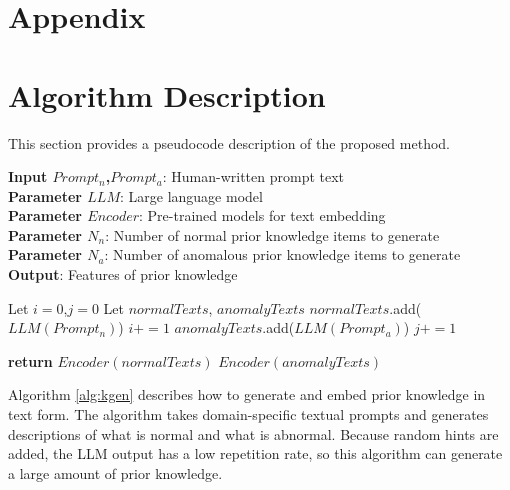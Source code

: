 \clearpage
\appendix
\section*{Appendix}
\renewcommand{\thefigure}{A\arabic{figure}}
\renewcommand{\thetable}{A\arabic{table}}
\renewcommand{\thealgorithm}{A\arabic{algorithm}}
\setcounter{figure}{0}
\setcounter{table}{0}
\setcounter{algorithm}{0}

\section{Algorithm Description}

This section provides a pseudocode description of the proposed method.

\begin{algorithm}[htb]
\caption{Algorithm for prior knowledge generation}
\label{alg:kgen}
\textbf{Input $Prompt_{n}$,$Prompt_{a}$}: Human-written prompt text\\
\textbf{Parameter $LLM$}: Large language model\\
\textbf{Parameter $Encoder$}: Pre-trained models for text embedding\\
\textbf{Parameter $N_{n}$}: Number of normal prior knowledge items to generate\\
\textbf{Parameter $N_{a}$}: Number of anomalous prior knowledge items to generate\\
\textbf{Output}: Features of prior knowledge \\
\begin{algorithmic}[1] %
\STATE Let $i=0$,$j=0$
\STATE Let $normalTexts$, $anomalyTexts$
\STATE $normalTexts$.add($LLM(Prompt_{n})$)
\STATE $i += 1$
\ENDWHILE
{}
\STATE $anomalyTexts$.add($LLM(Prompt_{a})$)
\STATE $j += 1$
\ENDWHILE

\STATE \textbf{return} $Encoder(normalTexts)$ 
\STATE \quad \quad \quad $Encoder(anomalyTexts)$
\end{algorithmic}
\end{algorithm}

Algorithm \ref{alg:kgen} describes how to generate and embed prior knowledge in text form. The algorithm takes domain-specific textual prompts and generates descriptions of what is normal and what is abnormal. Because random hints are added, the LLM output has a low repetition rate, so this algorithm can generate a large amount of prior knowledge.

